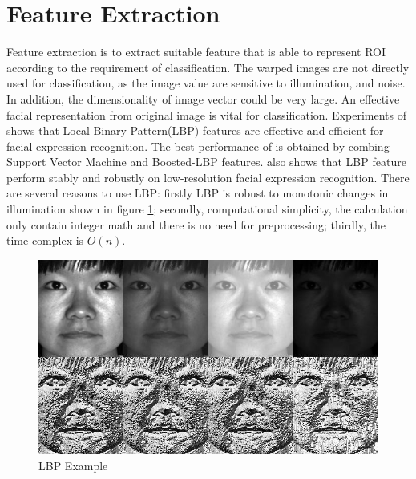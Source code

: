 \section{Feature Extraction}
Feature extraction is to extract suitable feature that is able to represent ROI according to the requirement of classification. The warped images are not directly used for classification, as the image value are sensitive to illumination, and noise. In addition, the dimensionality of image vector could be very large. An effective facial representation from original image is vital for classification. Experiments of \cite{shan2009facial} shows that Local Binary Pattern(LBP) features are effective and efficient for facial expression recognition. The best performance of \cite{shan2009facial} is obtained by combing Support Vector Machine and Boosted-LBP features. \cite{shan2009facial} also shows that LBP feature perform stably and robustly on low-resolution facial expression recognition. There are several reasons to use LBP: firstly LBP is robust to monotonic changes in illumination shown in figure \ref{fig:LBPE00}; secondly, computational simplicity, the calculation only contain integer math and there is no need for preprocessing; thirdly, the time complex is $O(n)$.
\begin{figure}[ht]
\centering
\includegraphics[width = .5\textwidth]{imgs/lbp_yale.jpg}
\caption[The LOF caption]{LBP Example\footnotemark}
\label{fig:LBPE00}
\end{figure}
